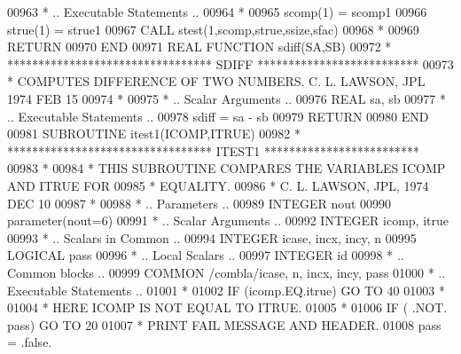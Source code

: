 \begin{DoxyCode}
00963 \textcolor{comment}{*     .. Executable Statements ..}
00964 \textcolor{comment}{*}
00965       scomp(1) = scomp1
00966       strue(1) = strue1
00967       \textcolor{keyword}{CALL }stest(1,scomp,strue,ssize,sfac)
00968 \textcolor{comment}{*}
00969       \textcolor{keywordflow}{RETURN}
00970 \textcolor{keyword}{      END}
00971 \textcolor{keyword}{      REAL             }\textcolor{keyword}{FUNCTION }sdiff(SA,SB)
00972 \textcolor{comment}{*     ********************************* SDIFF **************************}
00973 \textcolor{comment}{*     COMPUTES DIFFERENCE OF TWO NUMBERS.  C. L. LAWSON, JPL 1974 FEB 15}
00974 \textcolor{comment}{*}
00975 \textcolor{comment}{*     .. Scalar Arguments ..}
00976       \textcolor{keywordtype}{REAL}                            sa, sb
00977 \textcolor{comment}{*     .. Executable Statements ..}
00978       sdiff = sa - sb
00979       \textcolor{keywordflow}{RETURN}
00980 \textcolor{keyword}{      END}
00981 \textcolor{keyword}{      SUBROUTINE }itest1(ICOMP,ITRUE)
00982 \textcolor{comment}{*     ********************************* ITEST1 *************************}
00983 \textcolor{comment}{*}
00984 \textcolor{comment}{*     THIS SUBROUTINE COMPARES THE VARIABLES ICOMP AND ITRUE FOR}
00985 \textcolor{comment}{*     EQUALITY.}
00986 \textcolor{comment}{*     C. L. LAWSON, JPL, 1974 DEC 10}
00987 \textcolor{comment}{*}
00988 \textcolor{comment}{*     .. Parameters ..}
00989       \textcolor{keywordtype}{INTEGER}           nout
00990       parameter(nout=6)
00991 \textcolor{comment}{*     .. Scalar Arguments ..}
00992       \textcolor{keywordtype}{INTEGER}           icomp, itrue
00993 \textcolor{comment}{*     .. Scalars in Common ..}
00994       \textcolor{keywordtype}{INTEGER}           icase, incx, incy, n
00995       \textcolor{keywordtype}{LOGICAL}           pass
00996 \textcolor{comment}{*     .. Local Scalars ..}
00997       \textcolor{keywordtype}{INTEGER}           id
00998 \textcolor{comment}{*     .. Common blocks ..}
00999       \textcolor{keyword}{COMMON}            /combla/icase, n, incx, incy, pass
01000 \textcolor{comment}{*     .. Executable Statements ..}
01001 \textcolor{comment}{*}
01002       \textcolor{keywordflow}{IF} (icomp.EQ.itrue) \textcolor{keywordflow}{GO TO} 40
01003 \textcolor{comment}{*}
01004 \textcolor{comment}{*                            HERE ICOMP IS NOT EQUAL TO ITRUE.}
01005 \textcolor{comment}{*}
01006       \textcolor{keywordflow}{IF} ( .NOT. pass) \textcolor{keywordflow}{GO TO} 20
01007 \textcolor{comment}{*                             PRINT FAIL MESSAGE AND HEADER.}
01008       pass = .false.

\end{DoxyCode}
